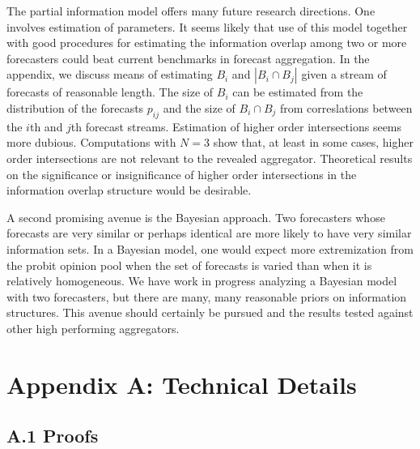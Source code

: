 \documentclass[11pt]{article}
\theoremstyle{definition}
\theoremstyle{definition}
\begin{document}
The partial information model offers many future research directions. 
One involves estimation of parameters.  It seems likely that use of
this model together with good procedures for estimating the information
overlap among two or more forecasters could beat current benchmarks
in forecast aggregation.  In the appendix, we discuss means of 
estimating $B_i$ and $|B_i \cap B_j|$ given a stream of forecasts
of reasonable length.  The size of $B_i$ can be estimated from 
the distribution of the forecasts $p_{ij}$ and the size of 
$B_i \cap B_j$ from correslations between the $i$th and $j$th 
forecast streams.  Estimation of higher order intersections seems
more dubious.  Computations with $N=3$ show that, at least in some
cases, higher order intersections are not relevant to the
revealed aggregator.  Theoretical results on the significance or 
insignificance of higher order intersections in the information 
overlap structure would be desirable.

A second promising avenue is the Bayesian approach.  Two forecasters
whose forecasts are very similar or perhaps identical are more
likely to have very similar information sets.  In a Bayesian model,
one would expect more extremization from the probit opinion pool
when the set of forecasts is varied than when it is relatively
homogeneous.  We have work in progress analyzing a Bayesian model
with two forecasters, but there are many, many reasonable priors 
on information structures.  This avenue should certainly be 
pursued and the results tested against other high performing 
aggregators.

\appendix 
\section*{Appendix A: Technical Details}
\label{appendix}

\subsection*{A.1  Proofs}
\end{document}
